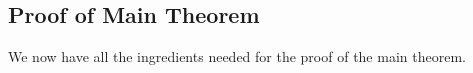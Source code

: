 \documentclass[a4paper,12pt,reqno,oneside]{amsart}
\theoremstyle{plain}
\begin{document}
\subsection{Proof of Main Theorem} \label{sec:main}

We now have all the ingredients needed for the proof of the main theorem.

\setcounter{claim}{0}
\end{document}
